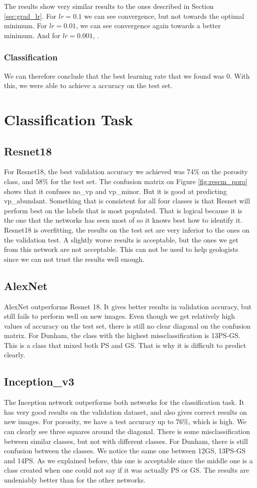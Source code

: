 The results show very similar results to the ones described in Section \ref{sec:grad_lr}. For \(lr=0.1\) we can see convergence, but not towards the optimal minimum. For \(lr=0.01\), we can see convergence again towards a better minimum. And for \(lr=0.001\), . 
\subsubsection{Classification}
We can therefore conclude that the best learning rate that we found was 0. With this, we were able to achieve a accuracy on the test set. 


\section{Classification Task}
\subsection{Resnet18}
For Resnet18, the best validation accuracy we achieved was 74\% on the porosity class, and 58\% for the test set. The confusion matrix on Figure \ref{fig:rescm_poro} shows that it confuses no\_vp and vp\_minor. But it is good at predicting vp\_abundant. Something that is consistent for all four classes is that Resnet will perform best on the labels that is most populated. That is logical because it is the one that the networks has seen most of so it knows best how to identify it. Resnet18 is overfitting, the results on the test set are very inferior to the ones on the validation test. A slightly worse results is acceptable, but the ones we get from this network are not acceptable. This can not be used to help geologists since we can not trust the results well enough.

\subsection{AlexNet}
AlexNet outperforms Resnet 18. It gives better results in validation accuracy, but still fails to perform well on new images. Even though we get relatively high values of accuracy on the test set, there is still no clear diagonal on the confusion matrix. For Dunham, the class with the highest missclassification is 13PS-GS. This is a class that mixed both PS and GS. That is why it is difficult to predict clearly. 

\subsection{Inception\_v3}
The Inception network outperforms both networks for the classification task. It has very good results on the validation dataset, and also gives correct results on new images. For porosity, we have a test accuracy up to 76\%, which is high. We can clearly see three squares around the diagonal. There is some misclassification between similar classes, but not with different classes. 
For Dunham, there is still confusion between the classes. We notice the same one between 12GS, 13PS-GS and 14PS. As we explained before, this one is acceptable since the middle one is a class created when one could not say if it was actually PS or GS. The results are undeniably better than for the other networks. 

